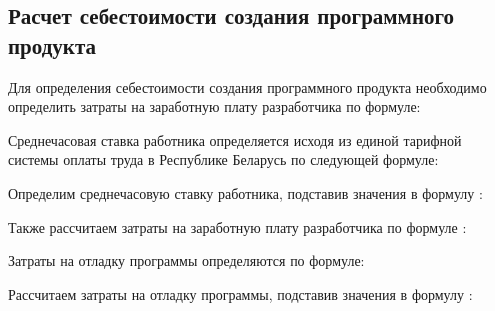 \subsection{Расчет себестоимости создания программного продукта}
\label{sec:economics:pppurecost}

Для определения себестоимости создания программного продукта необходимо определить затраты на заработную плату разработчика по формуле:
\developerHourPriceEquation

Среднечасовая ставка работника определяется исходя из единой тарифной системы оплаты труда в Республике Беларусь по следующей формуле:
\developerHourRateEquation

Определим среднечасовую ставку работника, подставив значения в формулу :
\developerHourRateFormulaApplied

Также рассчитаем затраты на заработную плату разработчика по формуле :
\developerHourPriceFormulaApplied

Затраты на отладку программы определяются по формуле:
\softwareDebugCostEquation

Рассчитаем затраты на отладку программы, подставив значения в формулу :
\softwareDebugCostFormulaApplied